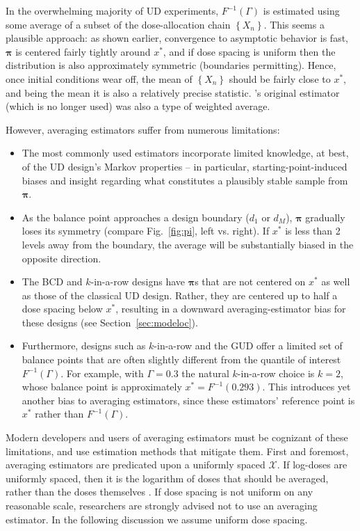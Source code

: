 In the overwhelming majority of UD experiments, $F^{-1}(\Gamma)$ is estimated using some average of a subset of the dose-allocation chain $\left\{X_n\right\}$. This seems a plausible approach: as shown earlier, convergence to asymptotic behavior is fast, $\boldsymbol{\pi}$ is centered fairly tightly around $x^*$, and if dose spacing is uniform then the distribution is also approximately symmetric (boundaries permitting). Hence, once initial conditions wear off, the mean of $\left\{X_n\right\}$ should be fairly close to $x^*$, and being the mean it is also a relatively precise statistic. \cite{Dixo:Mood:Amet:1948}'s original estimator (which is no longer used) was also a type of weighted average.

However, averaging estimators suffer from numerous limitations:
%
\begin{itemize}
\item The most commonly used estimators incorporate limited knowledge, at best, of the UD design's Markov properties -- in particular, starting-point-induced biases and insight regarding what constitutes a plausibly stable sample from $\boldsymbol{\pi}$.
\item As the balance point  approaches a design boundary ($d_1$ or $d_M$), $\boldsymbol{\pi}$ gradually loses its symmetry (compare Fig.~\ref{fig:pi}, left vs. right).  If  $x^*$ is less than 2 levels away from the boundary, the average will be substantially biased in the opposite direction.
\item The BCD and $k$-in-a-row designs have $\boldsymbol{\pi}$s that are not centered on $x^*$ as well as those of the classical UD design. Rather, they are centered up to half a dose spacing below $x^*$, resulting in a downward averaging-estimator bias for these designs (see Section~\ref{sec:modeloc}).
\item Furthermore, designs such as $k$-in-a-row and the GUD offer a limited set of balance points that are often slightly different from the quantile of interest $F^{-1}(\Gamma)$. For example, with $\Gamma=0.3$ the natural $k$-in-a-row choice is $k=2$, whose balance point is approximately $x^*=F^{-1}(0.293)$. This introduces yet another bias to averaging estimators, since these estimators' reference point is $x^*$ rather than $F^{-1}(\Gamma)$.
\end{itemize}
%
Modern developers and users of averaging estimators must be cognizant of these limitations, and use estimation methods that mitigate them. First and foremost, averaging estimators are predicated upon a uniformly spaced $\mathcal{X}$. If log-doses are uniformly spaced, then it is the logarithm of doses that should be averaged, rather than the doses themselves \citep{Garc:Pere:Forc:1998,Oron07}. If dose spacing is not uniform on any reasonable scale, researchers are strongly advised not to use an averaging estimator. In the following discussion we assume uniform dose spacing.

